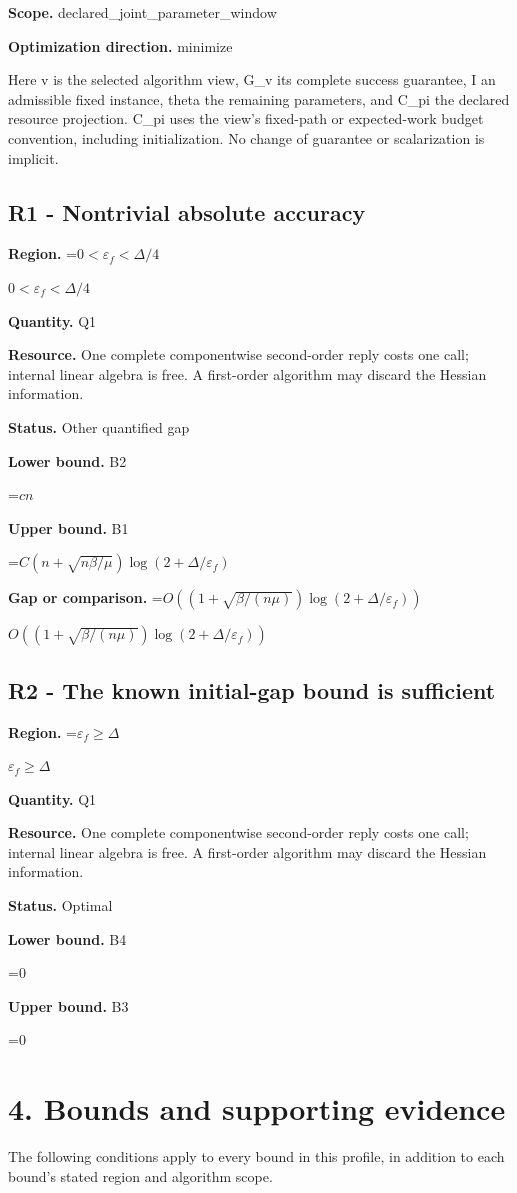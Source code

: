 \documentclass[10pt,a4paper]{article}
\newcommand{\AtlasMath}[1]{\par\begingroup\centering\setbox0=\hbox{$\displaystyle #1$}\ifdim\wd0>1.4\linewidth\typeout{ATLAS WIDE FORMULA: \the\wd0}\fi\ifdim\wd0>\linewidth\resizebox{\linewidth}{!}{\box0}\else\box0\fi\par\endgroup}
\newcommand{\AtlasInlineMath}[1]{\begingroup\setbox0=\hbox{$#1$}\ifdim\wd0>.4\linewidth\endgroup\AtlasMath{#1}\else\endgroup$#1$\fi}
\begin{document}
\textbf{Scope.} declared\_joint\_parameter\_window

\textbf{Optimization direction.} minimize

Here v is the selected algorithm view, G\_v its complete success guarantee, I an admissible fixed instance, theta the remaining parameters, and C\_pi the declared resource projection. C\_pi uses the view's fixed-path or expected-work budget convention, including initialization. No change of guarantee or scalarization is implicit.

\subsection{R1 - Nontrivial absolute accuracy}
\textbf{Region.} \AtlasInlineMath{0<\varepsilon_f<\Delta/4}

\textbf{Quantity.} Q1

\textbf{Resource.} One complete componentwise second-order reply costs one call; internal linear algebra is free. A first-order algorithm may discard the Hessian information.

\textbf{Status.} Other quantified gap

\textbf{Lower bound.} B2

\AtlasMath{cn}
\textbf{Upper bound.} B1

\AtlasMath{C(n+\sqrt{n\beta/\mu})\log(2+\Delta/\varepsilon_f)}
\textbf{Gap or comparison.} \AtlasInlineMath{O((1+\sqrt{\beta/(n\mu)})\log(2+\Delta/\varepsilon_f))}

\subsection{R2 - The known initial-gap bound is sufficient}
\textbf{Region.} \AtlasInlineMath{\varepsilon_f\ge\Delta}

\textbf{Quantity.} Q1

\textbf{Resource.} One complete componentwise second-order reply costs one call; internal linear algebra is free. A first-order algorithm may discard the Hessian information.

\textbf{Status.} Optimal

\textbf{Lower bound.} B4

\AtlasMath{0}
\textbf{Upper bound.} B3

\AtlasMath{0}
\section{4. Bounds and supporting evidence}
The following conditions apply to every bound in this profile, in addition to each bound's stated region and algorithm scope.
\end{document}
